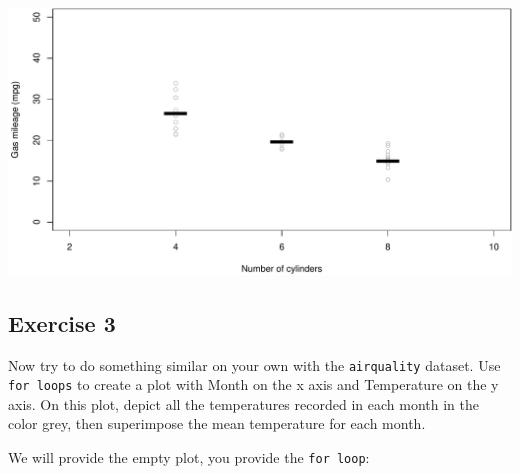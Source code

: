 \documentclass[
]{book}
\newenvironment{Shaded}{\begin{snugshade}}{\end{snugshade}}
\newcommand{\AttributeTok}[1]{\textcolor[rgb]{0.77,0.63,0.00}{#1}}
\newcommand{\CommentTok}[1]{\textcolor[rgb]{0.56,0.35,0.01}{\textit{#1}}}
\newcommand{\ControlFlowTok}[1]{\textcolor[rgb]{0.13,0.29,0.53}{\textbf{#1}}}
\newcommand{\DecValTok}[1]{\textcolor[rgb]{0.00,0.00,0.81}{#1}}
\newcommand{\FunctionTok}[1]{\textcolor[rgb]{0.00,0.00,0.00}{#1}}
\newcommand{\NormalTok}[1]{#1}
\newcommand{\OtherTok}[1]{\textcolor[rgb]{0.56,0.35,0.01}{#1}}
\newcommand{\SpecialCharTok}[1]{\textcolor[rgb]{0.00,0.00,0.00}{#1}}
\newcommand{\StringTok}[1]{\textcolor[rgb]{0.31,0.60,0.02}{#1}}
\begin{document}
\includegraphics{figures/unnamed-chunk-308-1.pdf}

\hypertarget{exercise-3-2}{%
\subsection*{Exercise 3}\label{exercise-3-2}}

Now try to do something similar on your own with the \texttt{airquality} dataset. Use \texttt{for\ loops} to create a plot with Month on the x axis and Temperature on the y axis. On this plot, depict all the temperatures recorded in each month in the color grey, then superimpose the mean temperature for each month.

We will provide the empty plot, you provide the \texttt{for\ loop}:

\begin{Shaded}
\end{Shaded}
\end{document}
